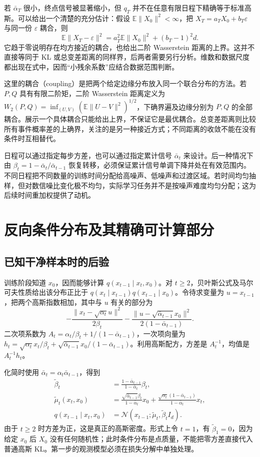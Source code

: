 \documentclass[UTF8,12pt,a4paper,fontset=fandol]{ctexart}
\begin{document}
若 $\bar\alpha_T$ 很小，终点信号被显著缩小，但 $q_T$ 并不在任意有限日程下精确等于标准高斯。可以给出一个清楚的充分估计：假设 $\mathbb E\|X_0\|^2<\infty$，把 $X_T=a_TX_0+b_T\varepsilon$ 与同一份 $\varepsilon$ 耦合，则
\[
 \mathbb E\|X_T-\varepsilon\|^2
 =a_T^2\mathbb E\|X_0\|^2+(b_T-1)^2d.
\]
它趋于零说明存在均方接近的耦合，也给出二阶 Wasserstein 距离的上界。这并不直接等同于 KL 或总变差距离的同样界，后两者需要另行分析。维数和数据尺度都出现在式中，因而“小残余系数”应结合数据范围判断。

这里的耦合（coupling）是把两个给定边缘分布放入同一个联合分布的方法。若 $P,Q$ 具有有限二阶矩，二阶 Wasserstein 距离定义为 $W_2(P,Q)=\inf_{(U,V)}(\mathbb E\|U-V\|^2)^{1/2}$，下确界遍及边缘分别为 $P,Q$ 的全部耦合。展示一个具体耦合只能给出上界，不保证它是最优耦合。总变差距离则比较所有事件概率差的上确界，关注的是另一种接近方式；不同距离的收敛不能在没有条件时互相替代。

日程可以通过指定每步方差，也可以通过指定累计信号 $\bar\alpha_t$ 来设计。后一种情况下由 $\beta_t=1-\bar\alpha_t/\bar\alpha_{t-1}$ 恢复转移，必须保证累计信号单调下降并处在有效范围内。不同日程把不同数量的训练时间分配给高噪声、低噪声和过渡区域。若时间均匀抽样，但对数信噪比变化极不均匀，实际学习任务并不是按噪声难度均匀分配；这为后续时间重加权提供了动机。

\section{反向条件分布及其精确可计算部分}
\label{sec:diff-posterior}
\subsection{已知干净样本时的后验}
训练阶段知道 $x_0$，因而能够计算 $q(x_{t-1}\mid x_t,x_0)$。对 $t\geq2$，贝叶斯公式及马尔可夫性质给出该分布正比于 $q(x_t\mid x_{t-1})q(x_{t-1}\mid x_0)$。令待求变量为 $u=x_{t-1}$，把两个高斯指数相加，其中与 $u$ 有关的部分为
\[
 -\frac{\|x_t-\sqrt{\alpha_t}u\|^2}{2\beta_t}
 -\frac{\|u-\sqrt{\bar\alpha_{t-1}}x_0\|^2}{2(1-\bar\alpha_{t-1})}.
\]
二次项系数为 $A_t=\alpha_t/\beta_t+1/(1-\bar\alpha_{t-1})$，一次项向量为 $h_t=\sqrt{\alpha_t}x_t/\beta_t+\sqrt{\bar\alpha_{t-1}}x_0/(1-\bar\alpha_{t-1})$。利用高斯配方，方差是 $A_t^{-1}$，均值是 $A_t^{-1}h_t$。

化简时使用 $\bar\alpha_t=\alpha_t\bar\alpha_{t-1}$，得到
\begin{align}
 \widetilde\beta_t&=\frac{1-\bar\alpha_{t-1}}{1-\bar\alpha_t}\beta_t,\label{eq:diff-posterior-var}\\
 \widetilde\mu_t(x_t,x_0)&=
 \frac{\sqrt{\bar\alpha_{t-1}}\beta_t}{1-\bar\alpha_t}x_0+
 \frac{\sqrt{\alpha_t}(1-\bar\alpha_{t-1})}{1-\bar\alpha_t}x_t,
 \label{eq:diff-posterior-mean}\\
 q(x_{t-1}\mid x_t,x_0)&=\mathcal N(x_{t-1};\widetilde\mu_t,\widetilde\beta_t I_d).
 \label{eq:diff-posterior}
\end{align}
由于 $t\geq2$ 时方差为正，这是真正的高斯密度。形式上令 $t=1$，有 $\widetilde\beta_1=0$，因为给定 $x_0$ 后 $X_0$ 没有任何随机性；此时条件分布是点质量，不能把零方差直接代入普通高斯 KL。第一步的观测模型必须在损失分解中单独处理。
\end{document}
